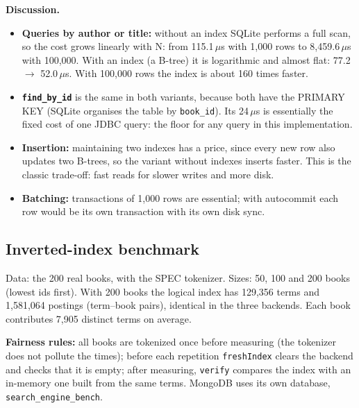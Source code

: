 \documentclass[11pt,a4paper]{article}
\newcommand{\code}[1]{\texttt{#1}}
\newcommand{\us}{\,$\mu$s}
\begin{document}
\textbf{Discussion.}
\begin{itemize}
  \item \textbf{Queries by author or title:} without an index SQLite performs a full scan, so the
        cost grows linearly with N: from 115.1\us{} with 1,000 rows to 8,459.6\us{} with 100,000.
        With an index (a B-tree) it is logarithmic and almost flat: 77.2 $\rightarrow$ 52.0\us. With
        100,000 rows the index is about 160 times faster.
  \item \textbf{\code{find\_by\_id}} is the same in both variants, because both have the PRIMARY KEY
        (SQLite organises the table by \code{book\_id}). Its 24\us{} is essentially the fixed cost of
        one JDBC query: the floor for any query in this implementation.
  \item \textbf{Insertion:} maintaining two indexes has a price, since every new row also updates
        two B-trees, so the variant without indexes inserts faster. This is the classic trade-off:
        fast reads for slower writes and more disk.
  \item \textbf{Batching:} transactions of 1,000 rows are essential; with autocommit each row would
        be its own transaction with its own disk sync.
\end{itemize}

\subsection{Inverted-index benchmark}
Data: the 200 real books, with the SPEC tokenizer. Sizes: 50, 100 and 200 books (lowest ids first).
With 200 books the logical index has 129,356 terms and 1,581,064 postings (term--book pairs),
identical in the three backends. Each book contributes 7,905 distinct terms on average.

\textbf{Fairness rules:} all books are tokenized once before measuring (the tokenizer does not
pollute the times); before each repetition \code{freshIndex} clears the backend and checks that it
is empty; after measuring, \code{verify} compares the index with an in-memory one built from the same
terms. MongoDB uses its own database, \code{search\_engine\_bench}.
\end{document}
